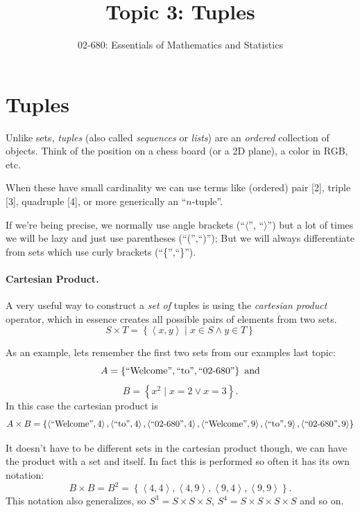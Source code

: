 


\title{Topic 3: Tuples}
\author{02-680: Essentials of Mathematics and Statistics}


\maketitle

\section{Tuples}
Unlike sets, \emph{tuples} (also called \emph{sequences} or \emph{lists}) are an \textit{ordered} collection of objects.
Think of the position on a chess board (or a 2D plane), a color in RGB, etc. 

When these have small cardinality we can use terms like (ordered) pair [2], triple [3], quadruple [4], or more generically an ``$n$-tuple''.

If we're being precise, we normally use angle brackets (``$\langle$'', ``$\rangle$'') but a lot of times we will be lazy and just use parentheses (``('',``)''); 
But we will always differentiate from sets which use curly brackets (``\{'',``\}'').

\paragraph{Cartesian Product.}
A very useful way to construct a \emph{set of} tuples is using the \emph{cartesian product} operator, 
which in essence creates all possible pairs of elements from two sets.
\[
S \times T = \left\{\left\langle x,y\right\rangle \mid x \in S \wedge y\in T\right\}
\]

As an example, lets remember the first two sets from our examples last topic: 
\[
A = \left\{\textnormal{``Welcome''}, \textnormal{``to''}, \textnormal{``02-680''}\right\} \textnormal{ and}
\]\[
B = \left\{x^2 \mid x=2 \vee x=3 \right\}.
\]
In this case the cartesian product is 
\[
A \times B = \left\{ \left\langle\textnormal{``Welcome''},4\right\rangle, \left\langle\textnormal{``to''},4\right\rangle, \left\langle\textnormal{``02-680''},4\right\rangle,
 \left\langle\textnormal{``Welcome''},9\right\rangle, \left\langle\textnormal{``to''},9\right\rangle, \left\langle\textnormal{``02-680''},9\right\rangle \right\}
\]

It doesn't have to be different sets in the cartesian product though, we can have the product with a set and itself.
In fact this is performed so often it has its own notation:
\[
B \times B = B^2 = \left\{ \left\langle 4,4 \right\rangle, \left\langle 4,9 \right\rangle,  \left\langle 9,4 \right\rangle, \left\langle 9,9 \right\rangle \right\}.
\]
This notation also generalizes, so $S^3 = S \times S \times S$, $S^4 = S\times S\times S\times S$ and so on.

